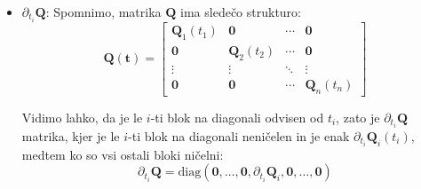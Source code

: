 \documentclass[isrm2, tisk]{fmfdelo}
\newcommand{\qmat}{\mathbf{Q}}
\newcommand{\tvec}{\mathbf{t}}
\begin{document}
\begin{itemize}
\item $\partial_{t_i}\qmat$: Spomnimo, matrika $\qmat$ ima sledečo strukturo:
\begin{equation}
    \qmat(\tvec) = \begin{bmatrix}
    \qmat_1(t_1) & \mathbf{0} & \cdots & \mathbf{0} \\
    \mathbf{0} & \qmat_2(t_2) & \cdots & \mathbf{0} \\
    \vdots & \vdots & \ddots & \vdots \\
    \mathbf{0} & \mathbf{0} & \cdots & \qmat_n(t_n)
    \end{bmatrix}
\end{equation}

Vidimo lahko, da je le $i$-ti blok na diagonali odvisen od $t_i$, zato je $\partial_{t_i}\qmat$ matrika, kjer je le $i$-ti blok na diagonali neničelen in je enak $\partial_{t_i}\qmat_i(t_i)$, medtem ko so vsi ostali bloki ničelni:
\begin{equation}
    \partial_{t_i} \mathbf{Q} = \text{diag}(\mathbf{0}, \ldots, \mathbf{0}, \partial_{t_i} \qmat_i, \mathbf{0}, \ldots, \mathbf{0})
\end{equation}



\end{itemize}
\end{document}
